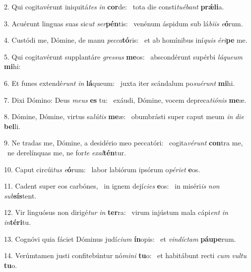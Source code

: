 2. Qui cogitavérunt iniquitá\textit{tes} \textit{in} \textbf{cor}de: \ast\  tota die consti\textit{tu}\textit{é}\textit{bant} \textbf{prǽ}\textbf{li}a.\

3. Acuérunt linguas suas sic\textit{ut} \textit{ser}\textbf{pén}tis: \ast\  venénum áspidum sub lá\textit{bi}\textit{is} \textit{e}\textbf{ó}rum.\

4. Custódi me, Dómine, de manu \textit{pec}\textit{ca}\textbf{tó}ris: \ast\  et ab homínibus iní\textit{quis} \textit{é}\textit{ri}\textbf{pe} me.\

5. Qui cogitavérunt supplantáre \textit{gres}\textit{sus} \textbf{me}os: \ast\  abscondérunt supérbi \textit{lá}\textit{que}\textit{um} \textbf{mi}hi:\

6. Et funes extendé\textit{runt} \textit{in} \textbf{lá}queum: \ast\  juxta iter scándalum po\textit{su}\textit{é}\textit{runt} \textbf{mi}hi.\

7. Dixi Dómino: Deus \textit{me}\textit{us} \textbf{es} tu: \ast\  exáudi, Dómine, vocem depreca\textit{ti}\textit{ó}\textit{nis} \textbf{me}æ.\

8. Dómine, Dómine, virtus sa\textit{lú}\textit{tis} \textbf{me}æ: \ast\  obumbrásti super caput meum \textit{in} \textit{di}\textit{e} \textbf{bel}li.\

9. Ne tradas me, Dómine, a desidério meo peccatóri: \dag\  cogita\textit{vé}\textit{runt} \textbf{con}tra me, \ast\  ne derelínquas me, ne for\textit{te} \textit{ex}\textit{al}\textbf{tén}tur.\

10. Caput circúi\textit{tus} \textit{e}\textbf{ó}rum: \ast\  labor labiórum ipsórum o\textit{pé}\textit{ri}\textit{et} \textbf{e}os.\

11. Cadent super eos carbónes, \dag\  in ignem dejí\textit{ci}\textit{es} \textbf{e}os: \ast\  in miséri\textit{is} \textit{non} \textit{sub}\textbf{sís}tent.\

12. Vir linguósus non dirigé\textit{tur} \textit{in} \textbf{ter}ra: \ast\  virum injústum mala cápi\textit{ent} \textit{in} \textit{in}\textbf{tér}\textbf{i}tu.\

13. Cognóvi quia fáciet Dóminus judí\textit{ci}\textit{um} \textbf{ín}opis: \ast\  et \textit{vin}\textit{díc}\textit{tam} \textbf{páu}\textbf{pe}rum.\

14. Verúmtamen justi confitebúntur nó\textit{mi}\textit{ni} \textbf{tu}o: \ast\  et habitábunt recti \textit{cum} \textit{vul}\textit{tu} \textbf{tu}o.\

